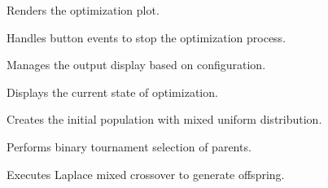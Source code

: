 \documentclass[12pt,a4paper]{article}
\begin{document}
\vspace{5mm}
\noindent {}


\noindent Renders the optimization plot.

\vspace{5mm}
\noindent {}


\noindent Handles button events to stop the optimization process.

\vspace{5mm}
\noindent {}


\noindent Manages the output display based on configuration.

\vspace{5mm}
\noindent {}


\noindent Displays the current state of optimization.

\vspace{5mm}
\noindent {}


\noindent Creates the initial population with mixed uniform distribution.

\vspace{5mm}
\noindent {}


\noindent Performs binary tournament selection of parents.

\vspace{5mm}
\noindent {}


\noindent Executes Laplace mixed crossover to generate offspring.
\end{document}
